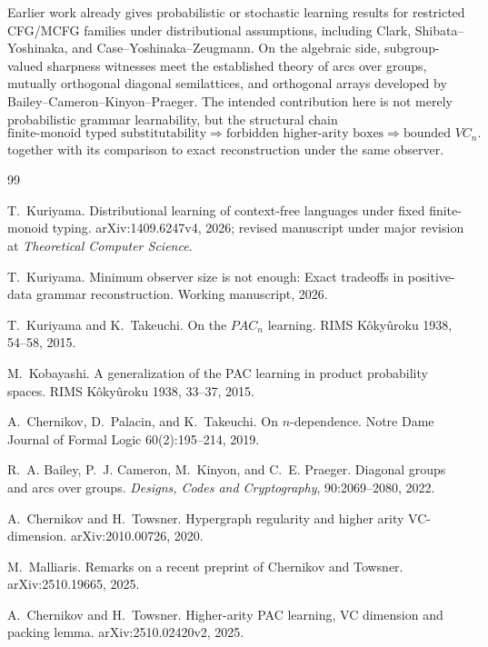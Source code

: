 \documentclass[11pt]{article}
\begin{document}
Earlier work already gives probabilistic or stochastic learning results for
restricted CFG/MCFG families under distributional assumptions, including
Clark, Shibata--Yoshinaka, and Case--Yoshinaka--Zeugmann.  On the algebraic
side, subgroup-valued sharpness witnesses meet the established theory of
arcs over groups, mutually orthogonal diagonal semilattices, and orthogonal
arrays developed by Bailey--Cameron--Kinyon--Praeger. The intended
contribution here is not merely probabilistic grammar learnability, but the
structural chain
\[
\text{finite-monoid typed substitutability}
\Longrightarrow
\text{forbidden higher-arity boxes}
\Longrightarrow
\text{bounded }VC_n.
\]
together with its comparison to exact reconstruction under the same observer.

\begin{thebibliography}{99}

T.~Kuriyama.
\newblock Distributional learning of context-free languages under fixed finite-monoid typing.
\newblock arXiv:1409.6247v4, 2026; revised manuscript under major revision at
\emph{Theoretical Computer Science}.

T.~Kuriyama.
\newblock Minimum observer size is not enough: Exact tradeoffs in positive-data grammar reconstruction.
\newblock Working manuscript, 2026.

T.~Kuriyama and K.~Takeuchi.
\newblock On the \(PAC_n\) learning.
\newblock RIMS K\^oky\^uroku 1938, 54--58, 2015.

M.~Kobayashi.
\newblock A generalization of the PAC learning in product probability spaces.
\newblock RIMS K\^oky\^uroku 1938, 33--37, 2015.

A.~Chernikov, D.~Palacin, and K.~Takeuchi.
\newblock On \(n\)-dependence.
\newblock Notre Dame Journal of Formal Logic 60(2):195--214, 2019.

R.~A. Bailey, P.~J. Cameron, M.~Kinyon, and C.~E. Praeger.
\newblock Diagonal groups and arcs over groups.
\newblock \emph{Designs, Codes and Cryptography}, 90:2069--2080, 2022.

A.~Chernikov and H.~Towsner.
\newblock Hypergraph regularity and higher arity VC-dimension.
\newblock arXiv:2010.00726, 2020.

M.~Malliaris.
\newblock Remarks on a recent preprint of Chernikov and Towsner.
\newblock arXiv:2510.19665, 2025.

A.~Chernikov and H.~Towsner.
\newblock Higher-arity PAC learning, VC dimension and packing lemma.
\newblock arXiv:2510.02420v2, 2025.


\end{thebibliography}
\end{document}
